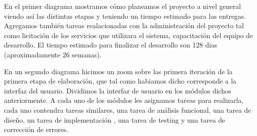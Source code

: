 \par

En el primer diagrama mostramos cómo planeamos el proyecto a nivel general viendo así las distintas etapas y teniendo un tiempo estimado para las entregas. Agregamos tambi\'en tareas realacionadas con la administración del proyecto tal como licitaci\'on de los servicios que utilizara el sistema, capacitación del equipo de desarrollo. El tiempo estimado para
finalizar el desarrollo son 128 dias (aproximadamente 26 semanas).	

\par
\begin{figure}[H]
\end{figure}

\par
En un segundo diagrama hicimos un zoom sobre las primera iteración de la primera etapa de elaboración, que tal como habiamos dicho corresponde a la interfaz del usuario. Dividimos la interfaz de usuario en los m\'odulos dichos anteriormente. A cada uno de los m\'odulos les asignamos tareas para realizarla, cada uno contendra tareas similares, una tarea de an\'alisis funcional, una tarea de diseño, un tarea de implementaci\'on , una tarea de testing y una tarea de correcci\'on de errores.

\par
\begin{figure}[H]
\begin{center}
\end{center}
\end{figure}

\renewcommand{\labelitemi}{$\tiny \blacksquare$}


